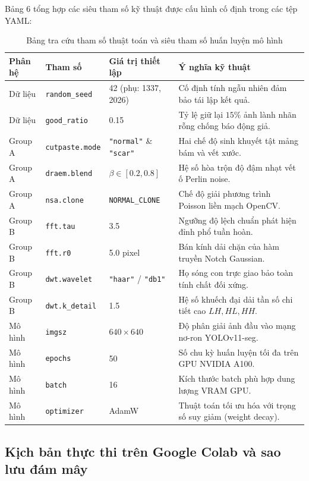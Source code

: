 Bảng 6 tổng hợp các siêu tham số kỹ thuật được cấu hình cố định trong các tệp YAML:
\begin{table}[h]
\centering
\caption{Bảng tra cứu tham số thuật toán và siêu tham số huấn luyện mô hình}
\label{tab:hyperparameters}
\begin{tabularx}{\textwidth}{l l p{3.5cm} X}
\toprule
\textbf{Phân hệ} & \textbf{Tham số} & \textbf{Giá trị thiết lập} & \textbf{Ý nghĩa kỹ thuật} \\
\midrule
Dữ liệu & \texttt{random\_seed} & 42 (phụ: 1337, 2026) & Cố định tính ngẫu nhiên đảm bảo tái lập kết quả. \\
Dữ liệu & \texttt{good\_ratio} & 0.15 & Tỷ lệ giữ lại $15\%$ ảnh lành nhãn rỗng chống báo động giả. \\
Group A & \texttt{cutpaste.mode} & \texttt{"normal"} \& \texttt{"scar"} & Hai chế độ sinh khuyết tật mảng bám và vết xước. \\
Group A & \texttt{draem.blend} & $\beta \in [0.2, 0.8]$ & Hệ số hòa trộn độ đậm nhạt vết ố Perlin noise. \\
Group A & \texttt{nsa.clone} & \texttt{NORMAL\_CLONE} & Chế độ giải phương trình Poisson liền mạch OpenCV. \\
Group B & \texttt{fft.tau} & 3.5 & Ngưỡng độ lệch chuẩn phát hiện đỉnh phổ tuần hoàn. \\
Group B & \texttt{fft.r0} & 5.0 pixel & Bán kính dải chặn của hàm truyền Notch Gaussian. \\
Group B & \texttt{dwt.wavelet} & \texttt{"haar"} / \texttt{"db1"} & Họ sóng con trực giao bảo toàn tính chất đối xứng. \\
Group B & \texttt{dwt.k\_detail} & 1.5 & Hệ số khuếch đại dải tần số chi tiết cao $LH, HL, HH$. \\
Mô hình & \texttt{imgsz} & $640 \times 640$ & Độ phân giải ảnh đầu vào mạng nơ-ron YOLOv11-seg. \\
Mô hình & \texttt{epochs} & 50 & Số chu kỳ huấn luyện tối đa trên GPU NVIDIA A100. \\
Mô hình & \texttt{batch} & 16 & Kích thước batch phù hợp dung lượng VRAM GPU. \\
Mô hình & \texttt{optimizer} & AdamW & Thuật toán tối ưu hóa với trọng số suy giảm (weight decay). \\
\bottomrule
\end{tabularx}
\end{table}

\subsection{Kịch bản thực thi trên Google Colab và sao lưu đám mây}

